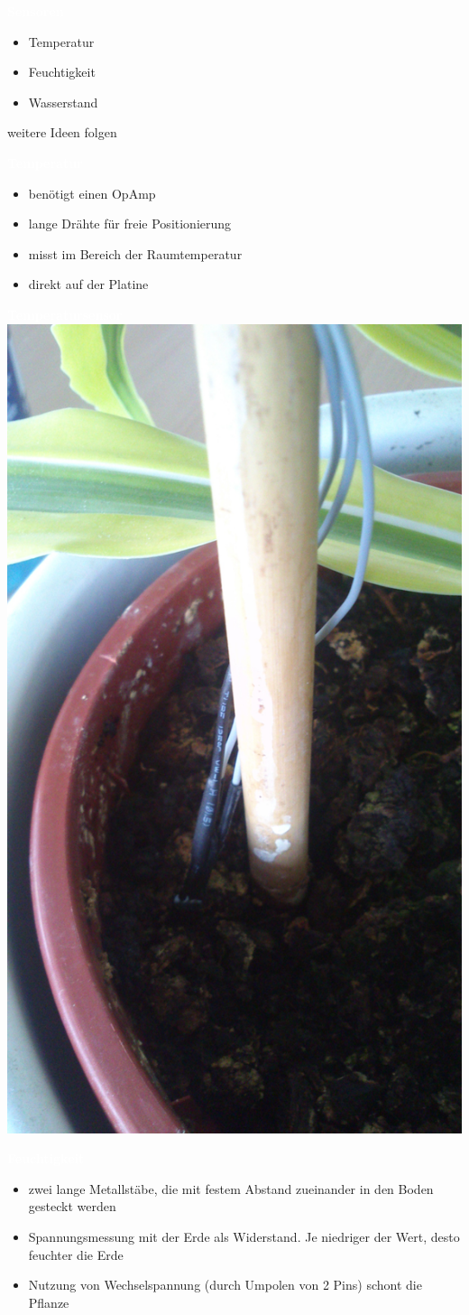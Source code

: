 \documentclass[bigger]{beamer}
\newcommand{\topic}[1]{{\huge{\textcolor{white}{\textbf{#1}}}}}
\begin{document}
\begin{frame}{\topic{Sensoren}}
	\begin{itemize}
		\item Temperatur
		\item Feuchtigkeit
		\item Wasserstand
	\end{itemize}
weitere Ideen folgen
\end{frame}

\begin{frame}{\topic{Temperatur}}
	\begin{itemize}
		\item benötigt einen OpAmp
		\item lange Drähte für freie Positionierung
		\item misst im Bereich der Raumtemperatur
		\item direkt auf der Platine
	\end{itemize}
\end{frame}

\begin{frame}{\topic{Temperatursensor}}
\includegraphics[width=0.4\linewidth]{temperatur.jpg}
\end{frame}

\begin{frame}{\topic{Feuchtigkeit}}
	\begin{itemize}
		\item zwei lange Metallstäbe, die mit festem Abstand zueinander in den Boden gesteckt werden
		\item Spannungsmessung mit der Erde als Widerstand. Je niedriger der Wert, desto feuchter die Erde
		\item Nutzung von Wechselspannung (durch Umpolen von 2 Pins) schont die Pflanze
	\end{itemize}
\end{frame}
\end{document}
